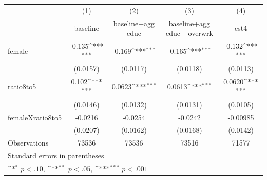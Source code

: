 {
\def\sym#1{\ifmmode^{#1}\else\(^{#1}\)\fi}
\begin{tabular}{l*{4}{c}}
\hline\hline
                    &\multicolumn{1}{c}{(1)}&\multicolumn{1}{c}{(2)}&\multicolumn{1}{c}{(3)}&\multicolumn{1}{c}{(4)}\\
                    &\multicolumn{1}{c}{baseline }&\multicolumn{1}{c}{baseline+agg educ}&\multicolumn{1}{c}{baseline+agg educ+ overwrk}&\multicolumn{1}{c}{est4}\\
\hline
female              &      -0.135\sym{***}&      -0.169\sym{***}&      -0.165\sym{***}&      -0.132\sym{***}\\
                    &    (0.0157)         &    (0.0117)         &    (0.0118)         &    (0.0113)         \\
[1em]
ratio8to5           &       0.102\sym{***}&      0.0623\sym{***}&      0.0613\sym{***}&      0.0620\sym{***}\\
                    &    (0.0146)         &    (0.0132)         &    (0.0131)         &    (0.0105)         \\
[1em]
femaleXratio8to5    &     -0.0216         &     -0.0254         &     -0.0242         &    -0.00985         \\
                    &    (0.0207)         &    (0.0162)         &    (0.0168)         &    (0.0142)         \\
\hline
Observations        &       73536         &       73536         &       73516         &       71577         \\
\hline\hline
\multicolumn{5}{l}{\footnotesize Standard errors in parentheses}\\
\multicolumn{5}{l}{\footnotesize \sym{*} \(p<.10\), \sym{**} \(p<.05\), \sym{***} \(p<.001\)}\\
\end{tabular}
}
